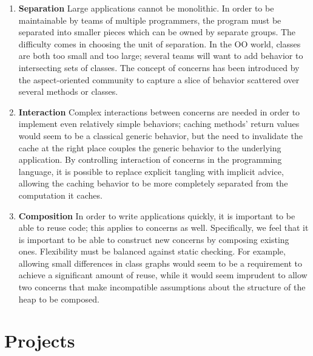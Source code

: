 \documentclass{acm_proc_article-sp}
\begin{document}
\begin{enumerate}
\item {\bf Separation}  
Large applications cannot be monolithic. 
In order to be maintainable by teams of multiple programmers, 
the program must be separated into smaller 
pieces which can be owned by separate groups.
The difficulty comes in choosing the unit of separation. 
In the OO world, classes are both too small and too large; several teams will want to add behavior to intersecting sets of classes. 
The concept of concerns has been introduced by the aspect-oriented community to capture a slice of behavior scattered over several methods or classes.

\item {\bf Interaction} 
Complex interactions between concerns are needed in order to implement even relatively simple behaviors; caching methods' return values would seem to be a classical generic behavior, but the need to invalidate the cache at the right place couples the generic behavior to the underlying application.
By controlling interaction of concerns in the programming language, it is possible to replace explicit tangling with implicit advice, allowing the caching behavior to be more completely separated from the computation it caches.

\item {\bf Composition} 
In order to write applications quickly, it is important to be able to reuse code; this applies to concerns as well.
Specifically, we feel that it is important to be able to construct new concerns by composing existing ones. 
Flexibility must be balanced against static checking.
For example, allowing small differences in class graphs would seem to be a requirement to achieve a significant amount of reuse, while it would seem imprudent to allow two concerns that make incompatible assumptions about the structure of the heap to be composed.

\end{enumerate}

\section{Projects}
\end{document}
